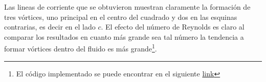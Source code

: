 Las lineas de corriente que se obtuvieron muestran claramente la formación de tres vórtices, uno principal en el centro del cuadrado y dos en las esquinas contrarias, es decir en el lado $c$. El efecto del número de Reynolds es claro al comparar los resultados en cuanto más grande sea tal número la tendencia a formar vórtices dentro del fluido es más grande\footnote{El código implementado se puede encontrar en el siguiente \href{https://github.com/jomen93/Cavidad_2D}{link}}.



\newpage









